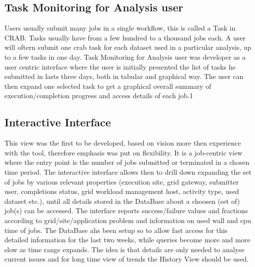 \subsection{Task Monitoring for Analysis user}
Users usually submit many jobs in a single workflow, this
is called a Task in CRAB. Tasks usually have from a few hundred
to a thousand jobs each. A user will oftern submit one crab task
for each dataset used in a particular analysis, up to a few
tasks in one day. Task Monitoring for Analysis user was
developer as a user centric interface where the user is
initially presented the list of tasks he submitted in lasts
three days, both in tabular and graphical way.
The user can then expand one selected task to get
a graphical overall summary of execution/completion progress
and access details of each job.1

\subsection{Interactive Interface}
This view was the first to be developed, based on
vision more then experience with the tool, therefore
emphasis was put on flexibility. It is a job-centric view
where the entry point is the number of jobs submitted or
terminated in a chosen time period.
The interactive interface
allows then to drill down expanding the set of jobs by
various relevant properties (execution site, grid gateway,
submitter user, completions status, grid workload management host,
activity type, used dataset etc.), until all details stored in the DataBase
about a choosen (set of) job(s) can be accessed.
The interface reports success/failure values and fractions
according to grid/site/application problem and information
on used wall and cpu time of jobs.
The DataBase ahs been setup so to allow fast access for this
detailed information for the last two weeks, while queries
become more and more slow as time range expands. The idea is that
details are only needed to analyse current issues and for
long time view of trends the History View should be used.

